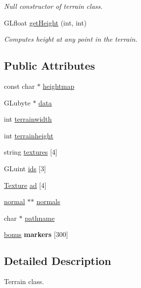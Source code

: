 \begin{DoxyCompactItemize}
\begin{DoxyCompactList}\small\item\em \-Null constructor of terrain class. \end{DoxyCompactList}\item 
\-G\-Lfloat \hyperlink{classterrain_a1b0e140f76afbc44982d143e7ebd56d4}{get\-Height} (int, int)
\begin{DoxyCompactList}\small\item\em \-Computes height at any point in the terrain. \end{DoxyCompactList}\end{DoxyCompactItemize}
\subsection*{\-Public \-Attributes}
\begin{DoxyCompactItemize}
\item 
const char $\ast$ \hyperlink{classterrain_abcf95fb0b8f7ef597a708e22ff10f42f}{heightmap}
\item 
\-G\-Lubyte $\ast$ \hyperlink{classterrain_ad07206f55359d1f2084ece2b06675425}{data}
\item 
int \hyperlink{classterrain_a50b9180d571e351f6c990c20eb49e18d}{terrainwidth}
\item 
int \hyperlink{classterrain_a1243f9d89e96dd55c48ea97eeea4053d}{terrainheight}
\item 
string \hyperlink{classterrain_ad6747f910061feba36ea983cc791c82f}{textures} \mbox{[}4\mbox{]}
\item 
\-G\-Luint \hyperlink{classterrain_abab37c6ed21ad3de44b7b11f31b702e6}{ids} \mbox{[}3\mbox{]}
\item 
\hyperlink{classTexture}{\-Texture} \hyperlink{classterrain_a71030654906d773de10eedbf121093b0}{ad} \mbox{[}4\mbox{]}
\item 
\hyperlink{structnormal}{normal} $\ast$$\ast$ \hyperlink{classterrain_a117ae013cf3d2da36b6febe47619c69b}{normals}
\item 
char $\ast$ \hyperlink{classterrain_a71b1c37938c0112a98a605855f7d9eef}{pathname}
\item 
\hypertarget{classterrain_a8190044bca035c6aed9562030a2d1c1e}{\hyperlink{structbonus}{bonus} {\bfseries markers} \mbox{[}300\mbox{]}}\label{classterrain_a8190044bca035c6aed9562030a2d1c1e}

\end{DoxyCompactItemize}


\subsection{\-Detailed \-Description}
\-Terrain class. 

